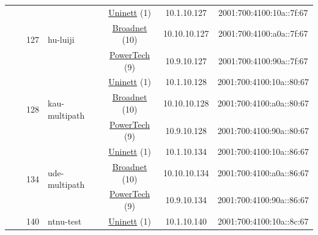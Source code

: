 \begin{small}
\begin{center}
\begin{longtable}{|c|c|c|c|c|c|c|c|}
  &  & \multirow{3}{*}{\tiny{127}} & \multicolumn{1}{|l|}{\multirow{3}{*}{\tiny{hu-luiji}}} & \multicolumn{2}{|c|}{\tiny{\href{https://www.uninett.no}{Uninett} (1)}} & \tiny{10.1.10.127} & \tiny{2001:700:4100:10a::7f:67} \\* \cline{5-5}\cline{6-6}\cline{7-7}\cline{8-8}
  &  &  &  & \multicolumn{2}{|c|}{\tiny{\href{https://www.broadnet.no}{Broadnet} (10)}} & \tiny{10.10.10.127} & \tiny{2001:700:4100:a0a::7f:67} \\* \cline{5-5}\cline{6-6}\cline{7-7}\cline{8-8}
  &  &  &  & \multicolumn{2}{|c|}{\tiny{\href{http://www.powertech.no}{PowerTech} (9)}} & \tiny{10.9.10.127} & \tiny{2001:700:4100:90a::7f:67} \\* \cline{3-3}\cline{4-4}\cline{5-5}\cline{6-6}\cline{7-7}\cline{8-8}
  &  & \multirow{3}{*}{\tiny{128}} & \multicolumn{1}{|l|}{\multirow{3}{*}{\tiny{kau-multipath}}} & \multicolumn{2}{|c|}{\tiny{\href{https://www.uninett.no}{Uninett} (1)}} & \tiny{10.1.10.128} & \tiny{2001:700:4100:10a::80:67} \\* \cline{5-5}\cline{6-6}\cline{7-7}\cline{8-8}
  &  &  &  & \multicolumn{2}{|c|}{\tiny{\href{https://www.broadnet.no}{Broadnet} (10)}} & \tiny{10.10.10.128} & \tiny{2001:700:4100:a0a::80:67} \\* \cline{5-5}\cline{6-6}\cline{7-7}\cline{8-8}
  &  &  &  & \multicolumn{2}{|c|}{\tiny{\href{http://www.powertech.no}{PowerTech} (9)}} & \tiny{10.9.10.128} & \tiny{2001:700:4100:90a::80:67} \\* \cline{3-3}\cline{4-4}\cline{5-5}\cline{6-6}\cline{7-7}\cline{8-8}
  &  & \multirow{3}{*}{\tiny{134}} & \multicolumn{1}{|l|}{\multirow{3}{*}{\tiny{ude-multipath}}} & \multicolumn{2}{|c|}{\tiny{\href{https://www.uninett.no}{Uninett} (1)}} & \tiny{10.1.10.134} & \tiny{2001:700:4100:10a::86:67} \\* \cline{5-5}\cline{6-6}\cline{7-7}\cline{8-8}
  &  &  &  & \multicolumn{2}{|c|}{\tiny{\href{https://www.broadnet.no}{Broadnet} (10)}} & \tiny{10.10.10.134} & \tiny{2001:700:4100:a0a::86:67} \\* \cline{5-5}\cline{6-6}\cline{7-7}\cline{8-8}
  &  &  &  & \multicolumn{2}{|c|}{\tiny{\href{http://www.powertech.no}{PowerTech} (9)}} & \tiny{10.9.10.134} & \tiny{2001:700:4100:90a::86:67} \\* \cline{3-3}\cline{4-4}\cline{5-5}\cline{6-6}\cline{7-7}\cline{8-8}
  &  & \multirow{3}{*}{\tiny{140}} & \multicolumn{1}{|l|}{\multirow{3}{*}{\tiny{ntnu-test}}} & \multicolumn{2}{|c|}{\tiny{\href{https://www.uninett.no}{Uninett} (1)}} & \tiny{10.1.10.140} & \tiny{2001:700:4100:10a::8c:67} \\* \cline{5-5}\cline{6-6}\cline{7-7}\cline{8-8}

\end{longtable}
\end{center}
\end{small}

